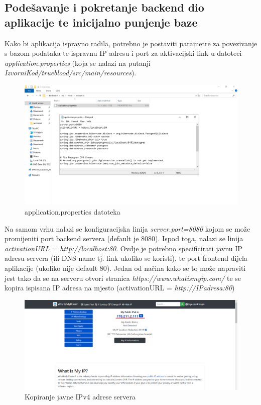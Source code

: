 			\eject
			\subsection{Podešavanje i pokretanje backend dio aplikacije te inicijalno punjenje baze}
			Kako bi aplikacija ispravno radila, potrebno je postaviti parametre za povezivanje s bazom podataka te ispravnu IP adresu i port za aktivacijski link u datoteci \textit{application.properties} (koja se nalazi na putanji \textit{IzvorniKod/trueblood/src/main/resources}).
			
			\begin{figure}[H]
			\centering
			\includegraphics[width=\textwidth, scale=0.5]{slike/ApplicationProperties}
			\caption{application.properties datoteka}
			\label{fig:ApplicationProperties}
			\end{figure}
			
			Na samom vrhu nalazi se konfiguracijska linija \textit{server.port=8080} kojom se može promijeniti port backend servera (default je 8080).
			Ispod toga, nalazi se linija \textit{activationURL = http://localhost:80}. Ovdje je potrebno specificirati javnu IP adresu servera (ili DNS name tj. link ukoliko se koristi), te port frontend dijela aplikacije (ukoliko nije default 80). Jedan od načina kako se to može napraviti jest tako da se na serveru otvori stranica \textit{https://www.whatismyip.com/} te se kopira ispisana IP adresa na mjesto (activationURL = \textit{http://IPadresa:80})
			
			\eject
			
			\begin{figure}[H]
			\centering
			\includegraphics[width=\textwidth, scale=0.5]{slike/WhatIsMyIp}
			\caption{Kopiranje javne IPv4 adrese servera}
			\label{fig:WhatIsMyIp}
			\end{figure}

